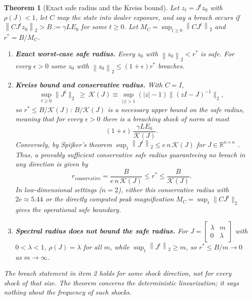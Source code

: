 \documentclass[10pt,twocolumn,letterpaper]{article}
\newtheorem{theorem}{Theorem}[section]
\theoremstyle{definition}
\theoremstyle{remark}
\newcommand{\R}{\mathbb{R}}
\newcommand{\norm}[1]{\left\lVert #1\right\rVert}
\begin{document}
\begin{theorem}[Exact safe radius and the Kreiss bound]
\label{thm:m5_kreiss_solvency}
Let $z_t=J^tz_0$ with $\rho(J)<1$, let $C$ map the state into dealer exposure, and say a breach occurs if $\norm{CJ^tz_0}_2>B:=\gamma LE_0$ for some $t\ge0$. Let $M_C=\sup_{t\ge0}\norm{CJ^t}_2$ and $r^*=B/M_C$.
\begin{enumerate}
    \item \textbf{Exact worst-case safe radius.} Every $z_0$ with $\norm{z_0}_2<r^*$ is safe. For every $\epsilon>0$ some $z_0$ with $\norm{z_0}_2\le(1+\epsilon)r^*$ breaches.
    \item \textbf{Kreiss bound and conservative radius.} With $C=I$,
    \begin{equation}
        \sup_{t \ge 0} \|J^t\|_2 \ \ge\ \mathcal{K}(J) \equiv \sup_{|z| > 1} (|z| - 1) \|(zI - J)^{-1}\|_2,
        \label{eq:kreiss_bound}
    \end{equation}
    so $r^*\le B/\mathcal K(J)$: $B/\mathcal{K}(J)$ is a \emph{necessary upper bound} on the safe radius, meaning that for every $\epsilon>0$ there is a breaching shock of norm at most
    \begin{equation}
        (1+\epsilon)\,\frac{\gamma L E_0}{\mathcal{K}(J)}.
        \label{eq:margin_breach_threshold}
    \end{equation}
    Conversely, by Spijker's theorem $\sup_t\norm{J^t}_2\le e\,n\,\mathcal K(J)$ for $J\in\R^{n\times n}$ \citep{spijker1991}. Thus, a \emph{provably sufficient conservative safe radius} guaranteeing no breach in any direction is given by
    \begin{equation}
        r_{\text{conservative}} = \frac{B}{e\,n\,\mathcal{K}(J)} \le r^* \le \frac{B}{\mathcal{K}(J)}.
    \end{equation}
    In low-dimensional settings ($n=2$), either this conservative radius with $2e \approx 5.44$ or the directly computed peak magnification $M_C = \sup_t \|CJ^t\|_2$ gives the operational safe boundary.
    \item \textbf{Spectral radius does not bound the safe radius.} For $J=\left[\begin{smallmatrix}\lambda&m\\0&\lambda\end{smallmatrix}\right]$ with $0<\lambda<1$, $\rho(J)=\lambda$ for all $m$, while $\sup_t\norm{J^t}_2\ge m$, so $r^*\le B/m\to0$ as $m\to\infty$.
\end{enumerate}
The breach statement in item 2 holds for \emph{some} shock direction, not for every shock of that size. The theorem concerns the deterministic linearization; it says nothing about the frequency of such shocks.
\end{theorem}
\end{document}
